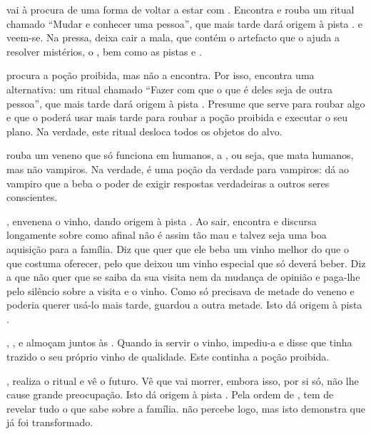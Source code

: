  vai à procura de uma forma de voltar a estar com . Encontra e rouba um ritual chamado ``Mudar e conhecer uma pessoa'', que mais tarde dará origem à pista .  e  veem-se. Na pressa,  deixa cair a mala, que contém o artefacto que o ajuda a resolver mistérios, o , bem como as pistas  e .

 procura a poção proibida, mas não a encontra. Por isso, encontra uma alternativa: um ritual chamado ``Fazer com que o que é deles seja de outra pessoa'', que mais tarde dará origem à pista . Presume que serve para roubar algo e que o poderá usar mais tarde para roubar a poção proibida e executar o seu plano. Na verdade, este ritual desloca todos os objetos do alvo.

 rouba um veneno que só funciona em humanos, a , ou seja, que mata humanos, mas não vampiros. Na verdade, é uma poção da verdade para vampiros: dá ao vampiro que a beba o poder de exigir respostas verdadeiras a outros seres conscientes.

,  envenena o vinho, dando origem à pista . Ao sair, encontra  e discursa longamente sobre como  afinal não é assim tão mau e talvez seja uma boa aquisição para a família. Diz que quer que ele beba um vinho melhor do que o que  costuma oferecer, pelo que deixou um vinho especial que só  deverá beber. Diz a  que não quer que se saiba da sua visita nem da mudança de opinião e paga-lhe pelo silêncio sobre a visita e o vinho. Como só precisava de metade do veneno e poderia querer usá-lo mais tarde, guardou a outra metade. Isto dá origem à pista .

, ,  e  almoçam juntos às . Quando  ia servir o vinho,  impediu-a e disse que tinha trazido o seu próprio vinho de qualidade. Este continha a poção proibida.

,  realiza o ritual e vê o futuro. Vê que  vai morrer, embora isso, por si só, não lhe cause grande preocupação. Isto dá origem à pista . Pela ordem de , tem de revelar tudo o que sabe sobre a família.  não percebe logo, mas isto demonstra que  já foi transformado.

